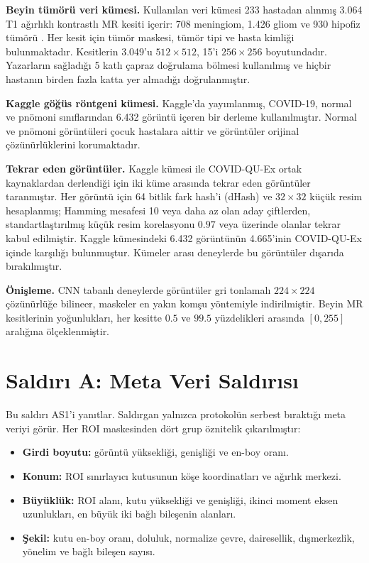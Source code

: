 \textbf{Beyin tümörü veri kümesi.} Kullanılan veri kümesi 233 hastadan alınmış 3.064 T1 ağırlıklı kontrastlı MR kesiti içerir: 708 meningiom, 1.426 gliom ve 930 hipofiz tümörü \cite{cheng2015brain}. Her kesit için tümör maskesi, tümör tipi ve hasta kimliği bulunmaktadır. Kesitlerin 3.049'u $512 \times 512$, 15'i $256 \times 256$ boyutundadır. Yazarların sağladığı 5 katlı çapraz doğrulama bölmesi kullanılmış ve hiçbir hastanın birden fazla katta yer almadığı doğrulanmıştır.

\textbf{Kaggle göğüs röntgeni kümesi.} Kaggle'da yayımlanmış, COVID-19, normal ve pnömoni sınıflarından 6.432 görüntü içeren bir derleme kullanılmıştır. Normal ve pnömoni görüntüleri çocuk hastalara aittir ve görüntüler orijinal çözünürlüklerini korumaktadır.

\textbf{Tekrar eden görüntüler.} Kaggle kümesi ile COVID-QU-Ex ortak kaynaklardan derlendiği için iki küme arasında tekrar eden görüntüler taranmıştır. Her görüntü için 64 bitlik fark hash'i (dHash) ve $32 \times 32$ küçük resim hesaplanmış; Hamming mesafesi 10 veya daha az olan aday çiftlerden, standartlaştırılmış küçük resim korelasyonu $0.97$ veya üzerinde olanlar tekrar kabul edilmiştir. Kaggle kümesindeki 6.432 görüntünün 4.665'inin COVID-QU-Ex içinde karşılığı bulunmuştur. Kümeler arası deneylerde bu görüntüler dışarıda bırakılmıştır.

\textbf{Önişleme.} CNN tabanlı deneylerde görüntüler gri tonlamalı $224 \times 224$ çözünürlüğe bilineer, maskeler en yakın komşu yöntemiyle indirilmiştir. Beyin MR kesitlerinin yoğunlukları, her kesitte $0.5$ ve $99.5$ yüzdelikleri arasında $[0, 255]$ aralığına ölçeklenmiştir.

\section{Saldırı A: Meta Veri Saldırısı}\label{sec:attackA}

Bu saldırı AS1'i yanıtlar. Saldırgan yalnızca protokolün serbest bıraktığı meta veriyi görür. Her ROI maskesinden dört grup öznitelik çıkarılmıştır:

\begin{itemize}
\item \textbf{Girdi boyutu:} görüntü yüksekliği, genişliği ve en-boy oranı.
\item \textbf{Konum:} ROI sınırlayıcı kutusunun köşe koordinatları ve ağırlık merkezi.
\item \textbf{Büyüklük:} ROI alanı, kutu yüksekliği ve genişliği, ikinci moment eksen uzunlukları, en büyük iki bağlı bileşenin alanları.
\item \textbf{Şekil:} kutu en-boy oranı, doluluk, normalize çevre, dairesellik, dışmerkezlik, yönelim ve bağlı bileşen sayısı.
\end{itemize}

